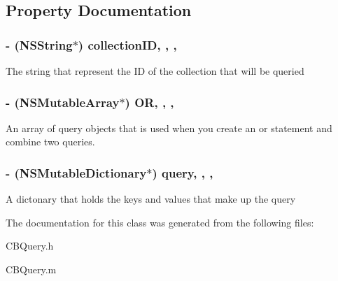 \subsection{Property Documentation}
\hypertarget{interface_c_b_query_ad7e594dc30699c9dbae407e55b588b00}{
\subsubsection[{collection\-I\-D}]{\setlength{\rightskip}{0pt plus 5cm}-\/ (N\-S\-String$\ast$) collection\-I\-D\hspace{0.3cm}{\ttfamily [read]}, {\ttfamily [write]}, {\ttfamily [nonatomic]}, {\ttfamily [strong]}}}\label{interface_c_b_query_ad7e594dc30699c9dbae407e55b588b00}
The string that represent the I\-D of the collection that will be queried \hypertarget{interface_c_b_query_a6751257a696c57bd191fca92204fdfa7}{
\subsubsection[{O\-R}]{\setlength{\rightskip}{0pt plus 5cm}-\/ (N\-S\-Mutable\-Array$\ast$) O\-R\hspace{0.3cm}{\ttfamily [read]}, {\ttfamily [write]}, {\ttfamily [nonatomic]}, {\ttfamily [strong]}}}\label{interface_c_b_query_a6751257a696c57bd191fca92204fdfa7}
An array of query objects that is used when you create an or statement and combine two queries. \hypertarget{interface_c_b_query_a896792b3b7ffa4a297fb91daedae2672}{
\subsubsection[{query}]{\setlength{\rightskip}{0pt plus 5cm}-\/ (N\-S\-Mutable\-Dictionary$\ast$) query\hspace{0.3cm}{\ttfamily [read]}, {\ttfamily [write]}, {\ttfamily [nonatomic]}, {\ttfamily [strong]}}}\label{interface_c_b_query_a896792b3b7ffa4a297fb91daedae2672}
A dictonary that holds the keys and values that make up the query 

The documentation for this class was generated from the following files\-:\begin{DoxyCompactItemize}
\item 
C\-B\-Query.\-h\item 
C\-B\-Query.\-m\end{DoxyCompactItemize}
